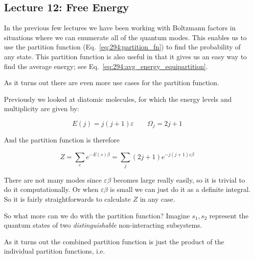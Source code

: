 \documentclass[10pt]{article}
\begin{document}
\subsection{Lecture 12: Free Energy}

\begin{blockquote}

	In the previous few lectures we have been working with Boltzmann factors in situations where we can enumerate all of the quantum modes.
	This enables us to use the partition function (Eq.~\ref{eq:294:partition_fn}) to find the probability of any state.
	This partition function is also useful in that it gives us an easy way to find the average energy; see Eq.~\ref{eq:294:avg_energy_equipartition}. 

	As it turns out there are even more use cases for the partition function.

	Previously we looked at diatomic molecules, for which the energy levels and multiplicity are given by:

	\begin{equation}
		E(j) = j(j+1) \varepsilon \qquad \Omega_j = 2j+1
	\end{equation}

	And the partition function is therefore

	\begin{equation}
		Z = \sum_e e^{-E(s)\beta} = \sum_j (2j+1) e^{-j(j+1) \varepsilon \beta} 
	\end{equation}

	There are not many modes since $ \varepsilon \beta $  becomes large really easily, so it is trivial to do it computationally. 
	Or when $ \varepsilon \beta $ is small we can just do it as a definite integral.
	So it is fairly straightforwards to calculate $ Z $  in any case.
	
\end{blockquote}



So what more can we do with the partition function?
Imagine $ s_1, s_2 $ represent the quantum states of two \textit{distinguishable} non-interacting subsystems.

As it turns out the combined partition function is just the product of the individual partition functions, i.e.
\end{document}
